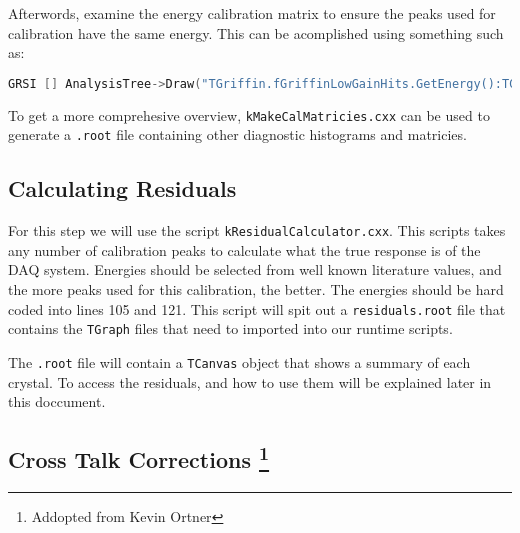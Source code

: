 \documentclass[10pt]{article} %
\begin{document}
Afterwords, examine the energy calibration matrix to ensure the peaks used for calibration have the same energy.
This can be acomplished using something such as:

\begin{lstlisting}[language=c++]
GRSI [] AnalysisTree->Draw("TGriffin.fGriffinLowGainHits.GetEnergy():TGriffin.fGriffinLowGainHits.GetChannel().fNumber>>h(64,0,64,4000,0,4000)","TSceptar.GetMultiplicity()>0","colz")
\end{lstlisting}

To get a more comprehesive overview, \texttt{kMakeCalMatricies.cxx} can be used to generate a \texttt{.root} file containing other diagnostic histograms and matricies.

\subsection{Calculating Residuals}

For this step we will use the script \texttt{kResidualCalculator.cxx}.
This scripts takes any number of calibration peaks to calculate what the true response is of the DAQ system.
Energies should be selected from well known literature values, and the more peaks used for this calibration, the better.
The energies should be hard coded into lines 105 and 121.
This script will spit out a \texttt{residuals.root} file that contains the \texttt{TGraph} files that need to imported into our runtime scripts.

The \texttt{.root} file will contain a \texttt{TCanvas} object that shows a summary of each crystal.
To access the residuals, and how to use them will be explained later in this doccument.


\subsection{Cross Talk Corrections \protect\footnote{Addopted from Kevin Ortner} }
\end{document}
